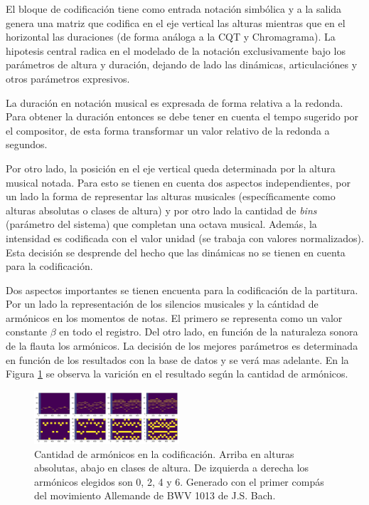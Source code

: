 \documentclass
  [ams,pdfout]%
	{aeslac}
\begin{document}
El bloque de codificación tiene como entrada notación simbólica y a la salida genera una matriz que codifica en el eje vertical las alturas mientras que en el horizontal las duraciones (de forma análoga a la CQT y Chromagrama). La hipotesis central radica en el modelado de la notación exclusivamente bajo los parámetros de altura y duración, dejando de lado las dinámicas, articulaciónes y otros parámetros expresivos. 

La duración en notación musical es expresada de forma relativa a la redonda. Para obtener la duración entonces se debe tener en cuenta el tempo sugerido por el compositor, de esta forma transformar un valor relativo de la redonda a segundos.  

Por otro lado, la posición en el eje vertical queda determinada por la altura musical notada. Para esto se tienen en cuenta dos aspectos independientes, por un lado la forma de representar las alturas musicales (específicamente como alturas absolutas o clases de altura) y por otro lado la cantidad de \textit{bins} (parámetro del sistema) que completan una octava musical. Además, la intensidad es codificada con el valor unidad (se trabaja con valores normalizados). Esta decisión se desprende del hecho que las dinámicas no se tienen en cuenta para la codificación. 

Dos aspectos importantes se tienen encuenta para la codificación de la partitura. Por un lado la representación de los silencios musicales y la cántidad de armónicos en los momentos de notas. El primero se representa como un valor constante $\beta$ en todo el registro. Del otro lado, en función de la naturaleza sonora de la flauta los armónicos. La decisión de los mejores parámetros es determinada en función de los resultados con la base de datos y se verá mas adelante. En la Figura \ref{fig:armonicos_param} se observa la varición en el resultado según la cantidad de armónicos.

\begin{figure}[h!]
\begin{center}
\includegraphics[width=0.48\textwidth]{imagenes/armonicos_param} 	
\caption{Cantidad de armónicos en la codificación. Arriba en alturas absolutas, abajo en clases de altura. De izquierda a derecha los armónicos elegidos son 0, 2, 4 y 6. Generado con el primer compás del movimiento Allemande de BWV 1013 de J.S. Bach.}
\label{fig:armonicos_param}
\end{center}
\end{figure}
\end{document}
